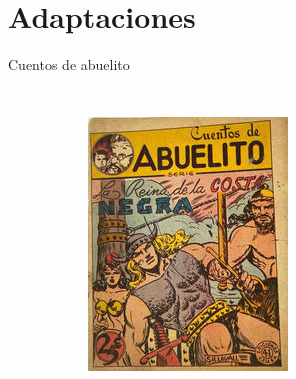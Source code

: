 \section{Adaptaciones}
\note[itemize]{
	\item
}

\begin{frame}{Cuentos de abuelito}
	\begin{columns}
		\begin{figure}[htb]
			\centering
			\begin{subfigure}[b]{0.35\textwidth}
				\includegraphics[width=\textwidth]{img/abuelito00}
			\end{subfigure}
			~
			\begin{subfigure}[b]{0.35\textwidth}

\end{subfigure}
\end{figure}
\end{columns}
\end{frame}
